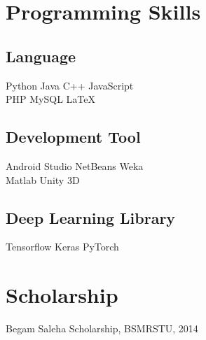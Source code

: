 \documentclass[]{deedy-resume-openfont}
\begin{document}
\begin{minipage}[t]{0.33\textwidth}




\section{Programming Skills}
\subsection{Language}
Python \textbullet{}   Java \textbullet{} C++ \textbullet{} JavaScript \\
PHP \textbullet{} MySQL \textbullet{} \LaTeX\ \\ 
\subsection{Development Tool}
Android Studio \textbullet{} NetBeans \textbullet{} Weka\\ Matlab \textbullet{} Unity 3D \\
\subsection{Deep Learning Library}
Tensorflow \textbullet{} Keras \textbullet{} PyTorch
\sectionsep

\section{Scholarship}
Begam Saleha Scholarship, BSMRSTU, 2014
\sectionsep


\end{minipage}
\end{document}
